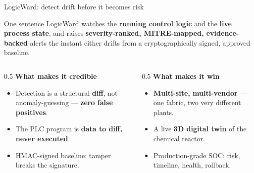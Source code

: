 \documentclass[aspectratio=169,11pt]{beamer}
\newcommand{\hl}[1]{{\color{accent}\textbf{#1}}}
\begin{document}
\begin{frame}{LogicWard: detect drift before it becomes risk}
\begin{block}{One sentence}
\small LogicWard watches the \hl{running control logic} and the \hl{live process state}, and raises \hl{severity-ranked, MITRE-mapped, evidence-backed} alerts the instant either drifts from a cryptographically signed, approved baseline.
\end{block}
\vspace{6pt}
\begin{columns}[T]
\begin{column}{0.5\textwidth}
\textbf{\color{navy}What makes it credible}
\begin{itemize}\small
  \item Detection is a structural \hl{diff}, not anomaly-guessing --- \hl{zero false positives}.
  \item The PLC program is \hl{data to diff, never executed}.
  \item HMAC-signed baseline: tamper breaks the signature.
\end{itemize}
\end{column}
\begin{column}{0.5\textwidth}
\textbf{\color{navy}What makes it win}
\begin{itemize}\small
  \item \hl{Multi-site, multi-vendor} --- one fabric, two very different plants.
  \item A live \hl{3D digital twin} of the chemical reactor.
  \item Production-grade SOC: risk, timeline, health, rollback.
\end{itemize}
\end{column}
\end{columns}
\end{frame}
\end{document}

